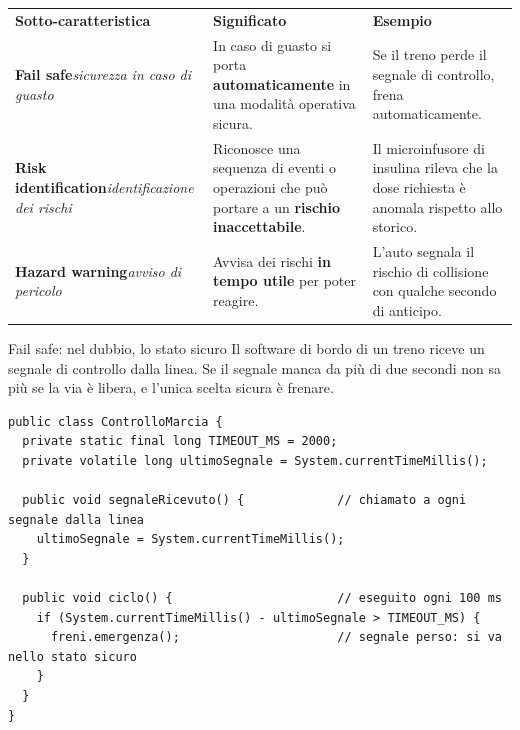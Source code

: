 

\begin{table}[H]
\centering
\renewcommand{\arraystretch}{1.4}
\begin{tabularx}{\textwidth}{P{3.6cm} L L}
\textbf{Sotto-caratteristica} & \textbf{Significato} & \textbf{Esempio} \\
\textbf{Fail safe}\newline\textit{\small sicurezza in caso di guasto} & In caso di guasto si porta \textbf{automaticamente} in una modalità operativa sicura. & Se il treno perde il segnale di controllo, frena automaticamente. \\
\textbf{Risk identification}\newline\textit{\small identificazione dei rischi} & Riconosce una sequenza di eventi o operazioni che può portare a un \textbf{rischio inaccettabile}. & Il microinfusore di insulina rileva che la dose richiesta è anomala rispetto allo storico. \\
\textbf{Hazard warning}\newline\textit{\small avviso di pericolo} & Avvisa dei rischi \textbf{in tempo utile} per poter reagire. & L'auto segnala il rischio di collisione con qualche secondo di anticipo. \\
\bottomrule
\end{tabularx}
\end{table}

\begin{esempio}{Fail safe: nel dubbio, lo stato sicuro}
Il software di bordo di un treno riceve un segnale di controllo dalla linea. Se il segnale manca da più di due secondi non
sa più se la via è libera, e l'unica scelta sicura è frenare.
\begin{lstlisting}[style=java, name=ControlloMarcia.java]
public class ControlloMarcia {
  private static final long TIMEOUT_MS = 2000;
  private volatile long ultimoSegnale = System.currentTimeMillis();

  public void segnaleRicevuto() {             // chiamato a ogni segnale dalla linea
    ultimoSegnale = System.currentTimeMillis();
  }

  public void ciclo() {                       // eseguito ogni 100 ms
    if (System.currentTimeMillis() - ultimoSegnale > TIMEOUT_MS) {
      freni.emergenza();                      // segnale perso: si va nello stato sicuro
    }
  }
}
\end{lstlisting}
\end{esempio}


